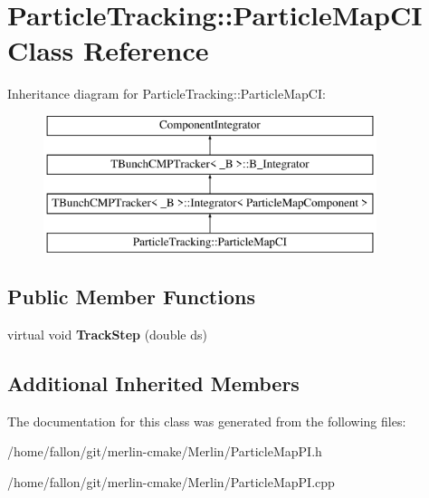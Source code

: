 \hypertarget{classParticleTracking_1_1ParticleMapCI}{}\section{Particle\+Tracking\+:\+:Particle\+Map\+CI Class Reference}
\label{classParticleTracking_1_1ParticleMapCI}
Inheritance diagram for Particle\+Tracking\+:\+:Particle\+Map\+CI\+:\begin{figure}[H]
\begin{center}
\leavevmode
\includegraphics[height=4.000000cm]{classParticleTracking_1_1ParticleMapCI}
\end{center}
\end{figure}
\subsection*{Public Member Functions}
\begin{DoxyCompactItemize}
\item 
\mbox{\label{classParticleTracking_1_1ParticleMapCI_a6100aee670bfe74d35d41bfb59e6ffe9}} 
virtual void {\bfseries Track\+Step} (double ds)
\end{DoxyCompactItemize}
\subsection*{Additional Inherited Members}


The documentation for this class was generated from the following files\+:\begin{DoxyCompactItemize}
\item 
/home/fallon/git/merlin-\/cmake/\+Merlin/Particle\+Map\+P\+I.\+h\item 
/home/fallon/git/merlin-\/cmake/\+Merlin/Particle\+Map\+P\+I.\+cpp\end{DoxyCompactItemize}

